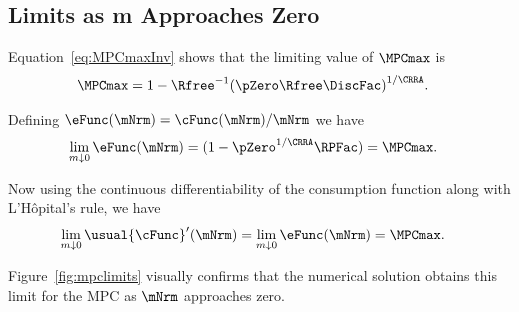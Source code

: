 \documentclass[BufferStockTheory]{subfiles}
\begin{document}
\begin{comment}
  Of course, the constraint never becomes irrelevant if human wealth is
  infinite.
We ruled out infinite human wealth at the beginning of this
  section by assuming $\Rfree> \PermGroFac$.
If this finite human wealth
  condition does not hold, it is possible to show that for any finite
  horizon consumer the marginal propensity to consume approaches the
  finite-horizon perfect foresight MPC as wealth approaches infinity.
  However, as the horizon gets longer, the perfect foresight MPC
  approaches zero.
It can be shown therefore that the limiting MPC for
  the converged consumption function approaches (but never reaches)
  zero.
(This is why we chose $\MPCminmin=0$ if the \FHWC~fails
  in the proofs above.)
\end{comment}

\hypertarget{LimitsAsmtToZero}{}
\subsection{Limits as \texorpdfstring{m}{m} Approaches Zero}
\label{subsec:LimitsAsmtToZero}

Equation~\eqref{eq:MPCmaxInv} shows that the limiting value of
$\MPCmax$ is
\begin{align*}
  \MPCmax  & = 1-{\Rfree}^{-1}{(\pZero  \Rfree\DiscFac)}^{1/\CRRA}.
\end{align*}

Defining $\eFunc(\mNrm)=\cFunc(\mNrm)/\mNrm$ we have
\begin{align*}
  \lim_{m \downarrow 0} \eFunc(\mNrm)  & = (1-\pZero^{1/\CRRA}\RPFac) = \MPCmax .
\end{align*}

Now using the continuous differentiability of the consumption function along with L'H\^opital's rule, we have
\begin{align*}
  \lim_{m \downarrow 0} \usual{\cFunc}^{\prime}(\mNrm)  & = \lim_{m \downarrow 0}
                                                          \eFunc(\mNrm) = \MPCmax.
\end{align*}

Figure~\ref{fig:mpclimits} visually confirms that the numerical solution obtains this limit for the MPC as $\mNrm$ approaches zero.
\end{document}
